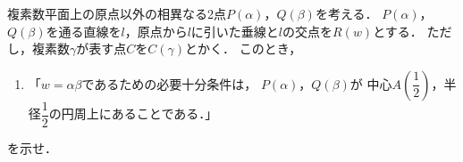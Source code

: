 \documentclass[../../main.tex]{subfiles}
\begin{document}
複素数平面上の原点以外の相異なる2点$P(\alpha)$，$Q(\beta)$を考える．
$P(\alpha)$，$Q(\beta)$を通る直線を$l$，原点から$l$に引いた垂線と$l$の交点を$R(w)$とする．
ただし，複素数$\gamma$が表す点$C$を$C(\gamma)$とかく．
このとき，
\begin{enumerate}
  \item []「$w=\alpha\beta$であるための必要十分条件は，
    $P(\alpha)$，$Q(\beta)$が
    中心$\displaystyle A \left( \dfrac{1}{2} \right)$，半径$\displaystyle\dfrac{1}{2}$の円周上にあることである．」
\end{enumerate}
を示せ．
\end{document}

